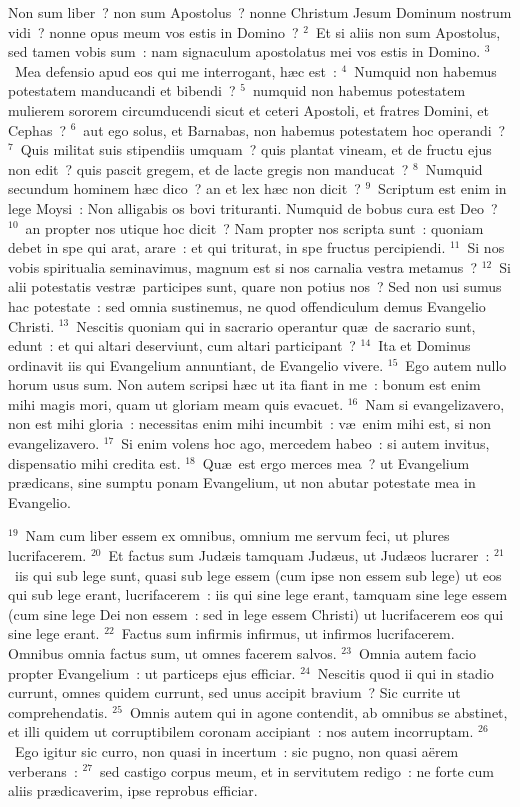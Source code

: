 \lettrine[lines=10,image=true,loversize=0.05,lraise=-0.03]{N}{}on sum liber~? non sum Apostolus~? nonne Christum Jesum Dominum nostrum vidi~? nonne opus meum vos estis in Domino~?
${}^{2}$~Et si aliis non sum Apostolus, sed tamen vobis sum~: nam signaculum apostolatus mei vos estis in Domino.
${}^{3}$~Mea defensio apud eos qui me interrogant, h\ae c est~:
${}^{4}$~Numquid non habemus potestatem manducandi et bibendi~?
${}^{5}$~numquid non habemus potestatem mulierem sororem circumducendi sicut et ceteri Apostoli, et fratres Domini, et Cephas~?
${}^{6}$~aut ego solus, et Barnabas, non habemus potestatem hoc operandi~?
${}^{7}$~Quis militat suis stipendiis umquam~? quis plantat vineam, et de fructu ejus non edit~? quis pascit gregem, et de lacte gregis non manducat~?
${}^{8}$~Numquid secundum hominem h\ae c dico~? an et lex h\ae c non dicit~?
${}^{9}$~Scriptum est enim in lege Moysi~: Non alligabis os bovi trituranti. Numquid de bobus cura est Deo~?
${}^{10}$~an propter nos utique hoc dicit~? Nam propter nos scripta sunt~: quoniam debet in spe qui arat, arare~: et qui triturat, in spe fructus percipiendi.
${}^{11}$~Si nos vobis spiritualia seminavimus, magnum est si nos carnalia vestra metamus~?
${}^{12}$~Si alii potestatis vestr\ae\ participes sunt, quare non potius nos~? Sed non usi sumus hac potestate~: sed omnia sustinemus, ne quod offendiculum demus Evangelio Christi.
${}^{13}$~Nescitis quoniam qui in sacrario operantur qu\ae\ de sacrario sunt, edunt~: et qui altari deserviunt, cum altari participant~?
${}^{14}$~Ita et Dominus ordinavit iis qui Evangelium annuntiant, de Evangelio vivere.
${}^{15}$~Ego autem nullo horum usus sum. Non autem scripsi h\ae c ut ita fiant in me~: bonum est enim mihi magis mori, quam ut gloriam meam quis evacuet.
${}^{16}$~Nam si evangelizavero, non est mihi gloria~: necessitas enim mihi incumbit~: v\ae\ enim mihi est, si non evangelizavero.
${}^{17}$~Si enim volens hoc ago, mercedem habeo~: si autem invitus, dispensatio mihi credita est.
${}^{18}$~Qu\ae\ est ergo merces mea~? ut Evangelium pr\ae dicans, sine sumptu ponam Evangelium, ut non abutar potestate mea in Evangelio.


${}^{19}$~Nam cum liber essem ex omnibus, omnium me servum feci, ut plures lucrifacerem.
${}^{20}$~Et factus sum Jud\ae is tamquam Jud\ae us, ut Jud\ae os lucrarer~:
${}^{21}$~iis qui sub lege sunt, quasi sub lege essem (cum ipse non essem sub lege) ut eos qui sub lege erant, lucrifacerem~: iis qui sine lege erant, tamquam sine lege essem (cum sine lege Dei non essem~: sed in lege essem Christi) ut lucrifacerem eos qui sine lege erant.
${}^{22}$~Factus sum infirmis infirmus, ut infirmos lucrifacerem. Omnibus omnia factus sum, ut omnes facerem salvos.
${}^{23}$~Omnia autem facio propter Evangelium~: ut particeps ejus efficiar.
${}^{24}$~Nescitis quod ii qui in stadio currunt, omnes quidem currunt, sed unus accipit bravium~? Sic currite ut comprehendatis.
${}^{25}$~Omnis autem qui in agone contendit, ab omnibus se abstinet, et illi quidem ut corruptibilem coronam accipiant~: nos autem incorruptam.
${}^{26}$~Ego igitur sic curro, non quasi in incertum~: sic pugno, non quasi a\"erem verberans~:
${}^{27}$~sed castigo corpus meum, et in servitutem redigo~: ne forte cum aliis pr\ae dicaverim, ipse reprobus efficiar.

